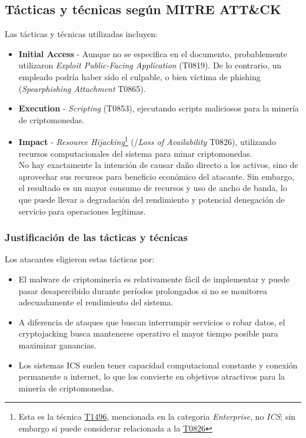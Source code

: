 \subsection{Tácticas y técnicas según MITRE ATT\&CK}
Las tácticas y técnicas utilizadas incluyen:

\begin{itemize}
    \item \textbf{Initial Access} - Aunque no se especifica en el documento, probablemente utilizaron \textit{Exploit Public-Facing Application} (T0819). De lo contrario, un empleado podría haber sido el culpable, o bien víctima de phishing (\textit{Spearphishing Attachment} T0865).

        \item \textbf{Execution} - \textit{Scripting} (T0853), ejecutando scripts maliciosos para la minería de criptomonedas.
        
        \item \textbf{Impact} - \textit{Resource Hijacking}\footnote{Esta es la técnica \href{https://attack.mitre.org/techniques/T1496/}{T1496}, mencionada en la categoria \textit{Enterprise}, no \textit{ICS}; sin embargo si puede considerar relacionada a la \href{https://attack.mitre.org/techniques/T0826/}{T0826}} (/\textit{Loss of Availability} T0826), utilizando recursos computacionales del sistema para minar criptomonedas.\\
        No hay exactamente la intención de causar daño directo a los activos, sino de aprovechar sus recursos para beneficio económico del atacante.
        Sin embargo, el resultado es un mayor consumo de recursos y uso de ancho de banda, lo que puede llevar a degradación del rendimiento y potencial denegación de servicio para operaciones legítimas.
\end{itemize}

\subsubsection{Justificación de las tácticas y técnicas}
Los atacantes eligieron estas tácticas por:

\begin{itemize}
    
    \item El malware de criptominería es relativamente fácil de implementar y puede pasar desapercibido durante períodos prolongados si no se monitorea adecuadamente el rendimiento del sistema.
    
    \item A diferencia de ataques que buscan interrumpir servicios o robar datos, el cryptojacking busca mantenerse operativo el mayor tiempo posible para maximizar ganancias.
    
    \item Los sistemas ICS suelen tener capacidad computacional constante y conexión permanente a internet, lo que los convierte en objetivos atractivos para la minería de criptomonedas.

\end{itemize}

